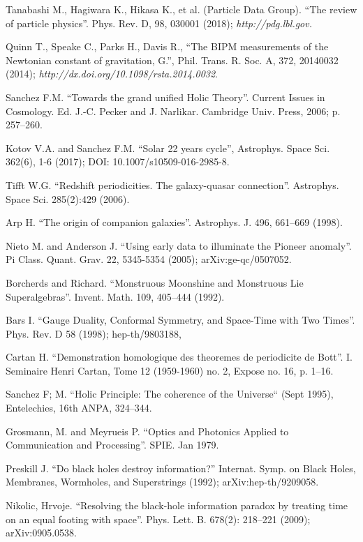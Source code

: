 \documentclass[twoside,draft]{article}
\begin{document}
\begin{sloppypar}
\begin{thebibliography}{99}
 Tanabashi M., Hagiwara K., Hikasa K., et al. (Particle Data
Group). ``The review of particle physics''. Phys. Rev. D, 98, 030001 (2018);
{\it http://pdg.lbl.gov.}

 Quinn T., Speake C., Parks H., Davis R., ``The BIPM measurements
of the Newtonian constant of gravitation, G.'', Phil. Trans. R. Soc. A, 372,
20140032 (2014); {\it http://dx.doi.org/10.1098/rsta.2014.0032}.

 Sanchez F.M. ``Towards the grand unified Holic Theory''. Current
Issues in Cosmology. Ed. J.-C. Pecker and J. Narlikar. Cambridge Univ. Press,
2006; p. 257--260.

 Kotov V.A. and Sanchez F.M. ``Solar 22 years cycle'', Astrophys.
Space Sci. 362(6), 1-6 (2017); DOI: 10.1007/s10509-016-2985-8.

 Tifft W.G. ``Redshift periodicities. The galaxy-quasar
connection''. Astrophys. Space Sci. 285(2):429 (2006).

 Arp H. ``The origin of companion galaxies''. Astrophys. J. 496,
661--669 (1998).

 Nieto M. and Anderson J. ``Using early data to illuminate the
Pioneer anomaly''. Pi Class. Quant. Grav. 22, 5345-5354 (2005);
arXiv:ge-qc/0507052.

 Borcherds and Richard. ``Monstruous Moonshine and Monstruous Lie
Superalgebras''. Invent. Math. 109, 405--444 (1992).

 Bars I. ``Gauge Duality, Conformal Symmetry, and Space-Time with
Two Times''. Phys. Rev. D 58 (1998); hep-th/9803188, 

 Cartan H. ``Demonstration homologique des theoremes de periodicite
de Bott''. I. Seminaire Henri Cartan, Tome 12 (1959-1960) no. 2, Expose no. 16,
p. 1--16.

 Sanchez F; M. ``Holic Principle: The coherence of the Universe`` (Sept 1995), Entelechies, 16th ANPA, 324--344.

 Grosmann, M. and Meyrueis P. ``Optics and Photonics Applied to Communication and Processing''. SPIE.  Jan 1979.

 Preskill J. ``Do black holes destroy information?'' Internat.
Symp. on Black Holes, Membranes, Wormholes, and Superstrings (1992);
arXiv:hep-th/9209058.

 Nikolic, Hrvoje. ``Resolving the black-hole information paradox by
treating time on an equal footing with space''. Phys. Lett. B. 678(2):
218--221 (2009); arXiv:0905.0538.


\end{thebibliography}
\end{sloppypar}
\end{document}
